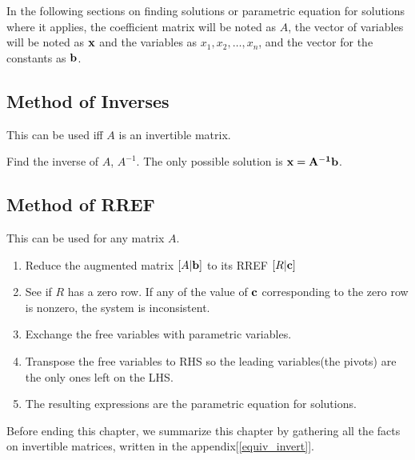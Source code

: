 \documentclass{report}
\begin{document}
		In the following sections on finding solutions or parametric equation for solutions where it applies, the coefficient matrix will be noted as $A$, the vector of variables will be noted as $\bf{x}$ and the variables as $x_1, x_2, \dots, x_n$, and the vector for the constants as $\bf{b}$.
		
		\subsection{Method of Inverses}
		
		This can be used iff $A$ is an invertible matrix.
		
		Find the inverse of $A$, $A^{-1}$.
		The only possible solution is $\bf{x}=A^{-1}\bf{b}$.
		
		\subsection{Method of RREF}
		
		This can be used for any matrix $A$.
		
		\begin{enumerate}
			\item Reduce the augmented matrix $\left[A|\bf{b}\right]$ to its RREF $\left[R|\bf{c}\right]$
			\item See if $R$ has a zero row. If any of the value of $\bf{c}$ corresponding to the zero row is nonzero, the system is inconsistent.
			\item Exchange the free variables with parametric variables.
			\item Transpose the free variables to RHS so the leading variables(the pivots) are the only ones left on the LHS.
			\item The resulting expressions are the parametric equation for solutions.
		\end{enumerate}
		
	
	Before ending this chapter, we summarize this chapter by gathering all the facts on invertible matrices, written in the appendix[\ref{equiv_invert}].
\end{document}

